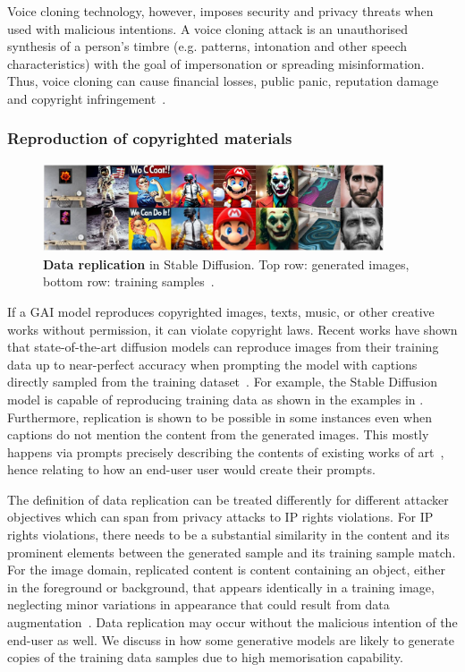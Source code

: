 \documentclass[conference,table]{IEEEtran}
\begin{document}
Voice cloning technology, however, imposes security and privacy threats when used with malicious intentions.
A voice cloning attack is an unauthorised synthesis of a person's timbre (e.g. patterns, intonation and other speech characteristics) with the goal of impersonation or spreading misinformation. 
Thus, voice cloning can cause financial losses, public panic, reputation damage and copyright infringement~\cite{brewster_fraudsters_2021}.

\subsubsection{Reproduction of copyrighted materials} 
    \begin{figure}[ht]
    \centering
    \includegraphics[width=0.9\textwidth]{replicate_userprompts.JPG}
    \caption{\textbf{Data replication} in Stable Diffusion. Top row: generated images, bottom row: training samples~\cite{somepalli_understanding_2023}.}
    \label{fig:replication-user}
\end{figure}
If a GAI model reproduces copyrighted images, texts, music, or other creative works without permission, it can violate copyright laws. 
Recent works have shown that state-of-the-art diffusion models can reproduce images from their training data up to near-perfect accuracy when prompting the model with captions directly sampled from the training dataset~\cite{somepalli_diffusion_2022,carlini_extracting_2023}. 
For example, the Stable Diffusion model is capable of reproducing training data as shown in the examples in .
Furthermore, replication is shown to be possible in some instances even when captions do not mention the content from the generated images. 
This mostly happens via prompts precisely describing the contents of existing works of art~\cite{somepalli_understanding_2023}, hence relating to how an end-user user would create their prompts.

The definition of data replication can be treated differently for different attacker objectives which can span from privacy attacks to IP rights violations. 
For IP rights violations, there needs to be a substantial similarity in the content and its prominent elements between the generated sample and its training sample match.
For the image domain, replicated content is content containing an object, either in the foreground or background, that appears identically in a training image, neglecting minor variations in appearance that could result from data augmentation~\cite{somepalli_diffusion_2022}.
Data replication may occur without the malicious intention of the end-user as well. 
We discuss in  how some generative models are likely to generate copies of the training data samples due to high memorisation capability. 
\end{document}
